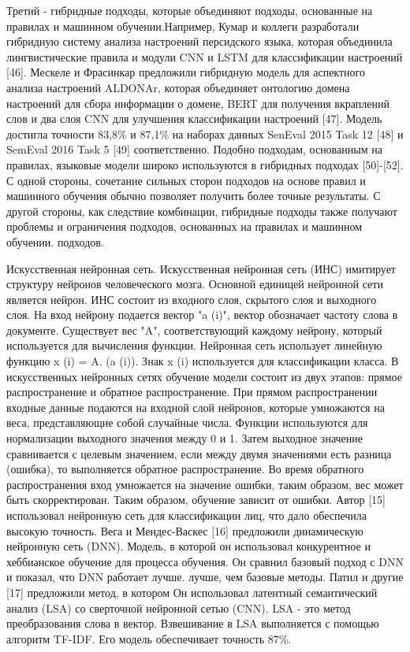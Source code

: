 Третий - гибридные подходы, которые объединяют подходы, основанные на правилах и
машинном обучении.Например, Кумар и коллеги разработали гибридную систему
анализа настроений персидского языка, которая объединила лингвистические правила
и модули CNN и LSTM для классификации настроений [46]. Мескеле и Фрасинкар
предложили гибридную модель для аспектного анализа настроений ALDONAr, которая
объединяет онтологию домена настроений для сбора информации о домене, BERT для
получения вкраплений слов и два слоя CNN для улучшения классификации настроений
[47]. Модель достигла точности 83,8\% и 87,1\% на наборах данных SenEval 2015
Task 12 [48] и SemEval 2016 Task 5 [49] соответственно. Подобно подходам,
основанным на правилах, языковые модели широко используются в гибридных подходах
[50]-[52].  С одной стороны, сочетание сильных сторон подходов на основе правил
и машинного обучения обычно позволяет получить более точные результаты. С другой
стороны, как следствие комбинации, гибридные подходы также получают проблемы и
ограничения подходов, основанных на правилах и машинном обучении.
подходов.\cite{article15}

Искусственная нейронная сеть. Искусственная нейронная сеть (ИНС) имитирует
структуру нейронов человеческого мозга. Основной единицей нейронной сети
является нейрон. ИНС состоит из входного слоя, скрытого слоя и выходного слоя.
На вход нейрону подается вектор "a (i)", вектор обозначает частоту слова в
документе. Существует вес "A", соответствующий каждому нейрону, который
используется для вычисления функции.  Нейронная сеть использует линейную функцию
x (i) = A. (a (i)). Знак x (i) используется для классификации класса.  В
искусственных нейронных сетях обучение модели состоит из двух этапов: прямое
распространение и обратное распространение. При прямом распространении входные
данные подаются на входной слой нейронов, которые умножаются на веса,
представляющие собой случайные числа. Функции используются для нормализации
выходного значения между 0 и 1. Затем выходное значение сравнивается с целевым
значением, если между двумя значениями есть разница (ошибка), то выполняется
обратное распространение. Во время обратного распространения вход умножается на
значение ошибки, таким образом, вес может быть скорректирован. Таким образом,
обучение зависит от ошибки. Автор [15] использовал нейронную сеть для
классификации лиц, что дало обеспечила высокую точность.  Вега и Мендес-Васкес
[16] предложили динамическую нейронную сеть (DNN). Модель, в которой он
использовал конкурентное и хеббианское обучение для процесса обучения.  Он
сравнил базовый подход с DNN и показал, что DNN работает лучше. лучше, чем
базовые методы. Патил и другие [17] предложили метод, в котором Он использовал
латентный семантический анализ (LSA) со сверточной нейронной сетью (CNN).  LSA -
это метод преобразования слова в вектор. Взвешивание в LSA выполняется с помощью
алгоритм TF-IDF. Его модель обеспечивает точность 87\%.~\cite{article16}


